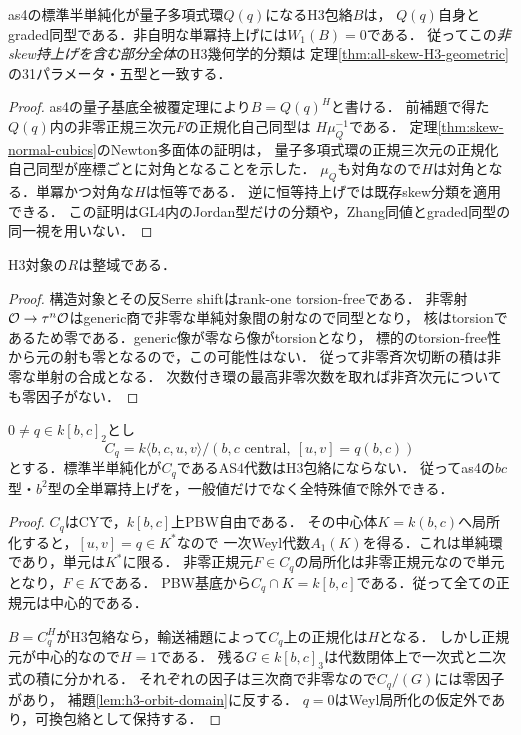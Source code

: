 \begin{theorem}
\label{thm:h3-quantum-unipotent-exclusion}
as4の標準半単純化が量子多項式環$Q(q)$になるH3包絡$B$は，
$Q(q)$自身とgraded同型である．非自明な単冪持上げには$W_1(B)=0$である．
従ってこの\emph{非skew持上げを含む部分全体}のH3幾何学的分類は
定理\ref{thm:all-skew-H3-geometric}の31パラメータ・五型と一致する．
\end{theorem}
\begin{proof}
as4の量子基底全被覆定理により$B=Q(q)^H$と書ける．
前補題で得た$Q(q)$内の非零正規三次元$F$の正規化自己同型は
$H\mu_Q^{-1}$である．
定理\ref{thm:skew-normal-cubics}のNewton多面体の証明は，
量子多項式環の正規三次元の正規化自己同型が座標ごとに対角となることを示した．
$\mu_Q$も対角なので$H$は対角となる．単冪かつ対角な$H$は恒等である．
逆に恒等持上げでは既存skew分類を適用できる．
この証明はGL4内のJordan型だけの分類や，Zhang同値とgraded同型の同一視を用いない．
\end{proof}

\begin{lemma}[H3の反標準環は整域]
\label{lem:h3-orbit-domain}
H3対象の$R$は整域である．
\end{lemma}
\begin{proof}
構造対象とその反Serre shiftはrank-one torsion-freeである．
非零射$\mathcal O\to\tau^n\mathcal O$はgeneric商で非零な単純対象間の射なので同型となり，
核はtorsionであるため零である．generic像が零なら像がtorsionとなり，
標的のtorsion-free性から元の射も零となるので，この可能性はない．
従って非零斉次切断の積は非零な単射の合成となる．
次数付き環の最高非零次数を取れば非斉次元についても零因子がない．
\end{proof}

\begin{theorem}[中心二平面Heisenberg基底の全単冪持上げの除外]
\label{thm:h3-central-quadratic-unipotent-exclusion}
$0\ne q\in k[b,c]_2$とし
\[
 C_q=k\langle b,c,u,v\rangle/(b,c\text{ central},\ [u,v]=q(b,c))
\]
とする．標準半単純化が$C_q$であるAS4代数はH3包絡にならない．
従ってas4の$bc$型・$b^2$型の全単冪持上げを，一般値だけでなく全特殊値で除外できる．
\end{theorem}
\begin{proof}
$C_q$はCYで，$k[b,c]$上PBW自由である．
その中心体$K=k(b,c)$へ局所化すると，$[u,v]=q\in K^*$なので
一次Weyl代数$A_1(K)$を得る．これは単純環であり，単元は$K^*$に限る．
非零正規元$F\in C_q$の局所化は非零正規元なので単元となり，$F\in K$である．
PBW基底から$C_q\cap K=k[b,c]$である．従って全ての正規元は中心的である．

$B=C_q^H$がH3包絡なら，輸送補題によって$C_q$上の正規化は$H$となる．
しかし正規元が中心的なので$H=1$である．
残る$G\in k[b,c]_3$は代数閉体上で一次式と二次式の積に分かれる．
それぞれの因子は三次商で非零なので$C_q/(G)$には零因子があり，
補題\ref{lem:h3-orbit-domain}に反する．
$q=0$はWeyl局所化の仮定外であり，可換包絡として保持する．
\end{proof}

